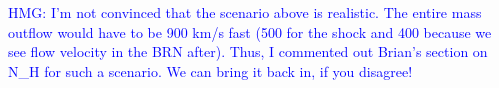 \documentclass[]{aastex631}
\begin{document}
\textcolor{blue}{HMG: I'm not convinced that the scenario above is realistic. The entire mass outflow would have to be 900 km/s fast (500 for the shock and 400 because we see flow velocity in the BRN after). Thus, I commented out Brian's section on N\_H for such a scenario. We can bring it back in, if you disagree!}

\end{document}
